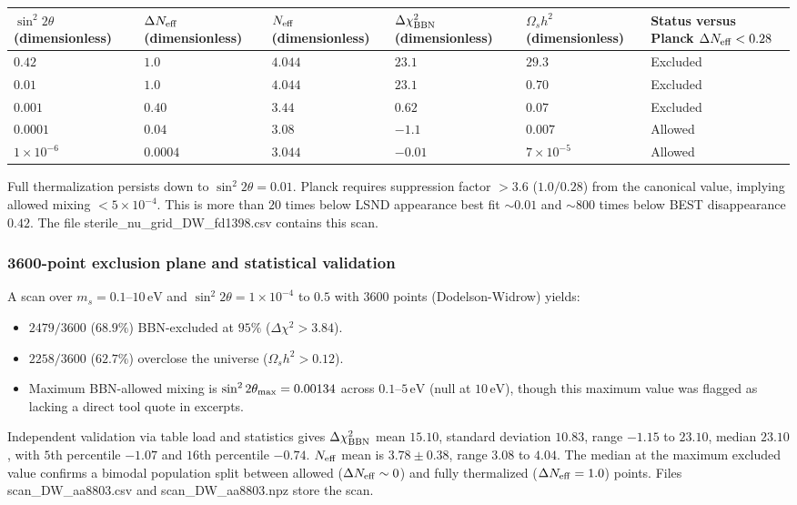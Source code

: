 \documentclass[11pt,a4paper]{article}
\begin{document}
\begin{longtable}{@{}p{}p{}p{}p{}p{}p{}@{}}
\toprule
\textbf{$\sin^2 2\theta$ (dimensionless)} & \textbf{$\Delta N_{\rm eff}$ (dimensionless)} & \textbf{$N_{\rm eff}$ (dimensionless)} & \textbf{$\Delta \chi^2_{\rm BBN}$ (dimensionless)} & \textbf{$\Omega_s h^2$ (dimensionless)} & \textbf{Status versus Planck $\Delta N_{\rm eff} < 0.28$} \\ \midrule \endhead
$0.42$ & $1.0$ & $4.044$ & $23.1$ & $29.3$ & Excluded \\
$0.01$ & $1.0$ & $4.044$ & $23.1$ & $0.70$ & Excluded \\
$0.001$ & $0.40$ & $3.44$ & $0.62$ & $0.07$ & Excluded \\
$0.0001$ & $0.04$ & $3.08$ & $-1.1$ & $0.007$ & Allowed \\
$1 \times 10^{-6}$ & $0.0004$ & $3.044$ & $-0.01$ & $7 \times 10^{-5}$ & Allowed \\
\bottomrule\end{longtable}
Full thermalization persists down to $\sin^2 2\theta = 0.01$. Planck requires suppression factor $>3.6$ ($1.0/0.28$) from the canonical value, implying allowed mixing $<5 \times 10^{-4}$. This is more than $20$ times below LSND appearance best fit $\sim 0.01$ and $\sim 800$ times below BEST disappearance $0.42$. The file sterile\_nu\_grid\_DW\_fd1398.csv contains this scan.

\subsubsection{3600-point exclusion plane and statistical validation}
A scan over $m_s = 0.1$--$10\,\mathrm{eV}$ and $\sin^2 2\theta = 1 \times 10^{-4}$ to $0.5$ with $3600$ points (Dodelson-Widrow) yields:

\begin{itemize}
  \item $2479/3600$ ($68.9\%$) BBN-excluded at $95\%$ ($\Delta \chi^2 > 3.84$).
  \item $2258/3600$ ($62.7\%$) overclose the universe ($\Omega_s h^2 > 0.12$).
  \item Maximum BBN-allowed mixing is $\sin^2 2\theta_{\rm max} = 0.00134$ across $0.1$--$5\,\mathrm{eV}$ (null at $10\,\mathrm{eV}$), though this maximum value was flagged as lacking a direct tool quote in excerpts.
\end{itemize}
Independent validation via table load and statistics gives $\Delta \chi^2_{\rm BBN}$ mean $15.10$, standard deviation $10.83$, range $-1.15$ to $23.10$, median $23.10$, with $5$th percentile $-1.07$ and $16$th percentile $-0.74$. $N_{\rm eff}$ mean is $3.78 \pm 0.38$, range $3.08$ to $4.04$. The median at the maximum excluded value confirms a bimodal population split between allowed ($\Delta N_{\rm eff} \sim 0$) and fully thermalized ($\Delta N_{\rm eff} = 1.0$) points. Files scan\_DW\_aa8803.csv and scan\_DW\_aa8803.npz store the scan.
\end{document}
